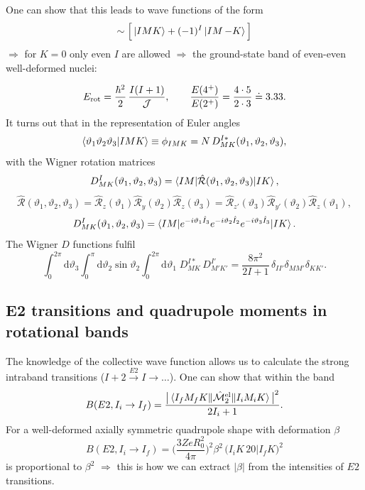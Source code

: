 \documentclass[11pt,a4paper]{article}
\newcommand{\op}[1]{\hat{#1}}
\newcommand{\ud}{\mathrm{d}}
\begin{document}
One can show that this leads to wave functions of the form
\[
\sim\Big[\ket{IMK}+(-1)^I\ket{IM\,{-K}}\Big]
\]
$\Rightarrow$ for $K=0$ only even $I$ are allowed $\Rightarrow$ the ground-state band of even-even well-deformed nuclei:
\begin{center}
\end{center}
\[
E_{\rm rot}=\frac{\hbar^2}{2}\,\frac{I(I+1)}{\mathcal J},\qquad
\frac{E(4^+)}{E(2^+)}=\frac{4\cdot5}{2\cdot3}\doteq3.33 .
\]
It turns out that in the representation of Euler angles
\[
\braket{\vartheta_1\vartheta_2\vartheta_3|IMK}\equiv\phi_{IMK}=N\,D^{I*}_{MK}(\vartheta_1,\vartheta_2,\vartheta_3),
\]
with the Wigner rotation matrices
\[
D^I_{MK}(\vartheta_1,\vartheta_2,\vartheta_3)=\braket{IM|\op{\mathcal R}(\vartheta_1,\vartheta_2,\vartheta_3)|IK},
\]
\[
\op{\mathcal R}(\vartheta_1,\vartheta_2,\vartheta_3)=\op{\mathcal R}_z(\vartheta_1)\op{\mathcal R}_y(\vartheta_2)\op{\mathcal R}_z(\vartheta_3)
=\op{\mathcal R}_{z'}(\vartheta_3)\op{\mathcal R}_{y'}(\vartheta_2)\op{\mathcal R}_z(\vartheta_1),
\]
\[
D^I_{MK}(\vartheta_1,\vartheta_2,\vartheta_3)=\braket{IM|e^{-i\vartheta_1\op I_3}e^{-i\vartheta_2\op I_2}e^{-i\vartheta_3\op I_3}|IK}.
\]
The Wigner $D$ functions fulfil
\[
\int_0^{2\pi}\ud\vartheta_3\int_0^\pi\ud\vartheta_2\sin\vartheta_2\int_0^{2\pi}\ud\vartheta_1\;D^{I*}_{MK}\,D^{I'}_{M'K'}=\frac{8\pi^2}{2I+1}\,\delta_{II'}\delta_{MM'}\delta_{KK'} .
\]

\subsection{E2 transitions and quadrupole moments in rotational bands}
The knowledge of the collective wave function allows us to calculate the strong intraband transitions ($I+2\xrightarrow{E2}I\to\dots$). One can show that within the band
\[
B(E2,I_i\to I_f)=\frac{\big|\braket{I_fM_fK\|\op{\mathcal M}^{\rm el}_2\|I_iM_iK}\big|^2}{2I_i+1}.
\]
For a well-deformed axially symmetric quadrupole shape with deformation $\beta$
\[
B(E2,I_i\to I_f)=\Big(\frac{3ZeR_0^2}{4\pi}\Big)^2\beta^2\,\big(I_iK\,20\big|I_fK\big)^2
\]
is proportional to $\beta^2$ $\Rightarrow$ this is how we can extract $|\beta|$ from the intensities of $E2$ transitions.
\end{document}
